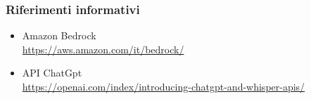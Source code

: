 \documentclass{article}
\begin{document}
\subsubsection{Riferimenti informativi}
\begin{itemize}
    \item Amazon Bedrock \\ \href{https://aws.amazon.com/it/bedrock/}{https://aws.amazon.com/it/bedrock/} \\ 
    \item API ChatGpt \\ \href{https://openai.com/index/introducing-chatgpt-and-whisper-apis/}{https://openai.com/index/introducing-chatgpt-and-whisper-apis/}
\end{itemize}
\end{document}

